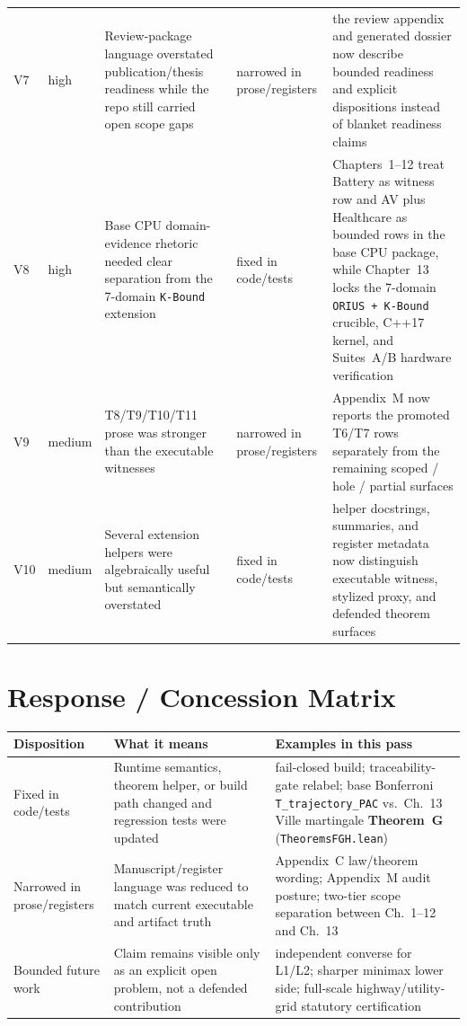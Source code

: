 \begin{longtable}{p{}p{}p{}p{}p{}}
V7 & high & Review-package language overstated publication/thesis readiness while the repo still carried open scope gaps & narrowed in prose/registers & the review appendix and generated dossier now describe bounded readiness and explicit dispositions instead of blanket readiness claims \\
V8 & high & Base CPU domain-evidence rhetoric needed clear separation from the 7-domain \texttt{K-Bound} extension & fixed in code/tests & Chapters~1--12 treat Battery as witness row and AV plus Healthcare as bounded rows in the base CPU package, while Chapter~13 locks the 7-domain \texttt{ORIUS + K-Bound} crucible, C++17 kernel, and Suites~A/B hardware verification \\
V9 & medium & T8/T9/T10/T11 prose was stronger than the executable witnesses & narrowed in prose/registers & Appendix~M now reports the promoted T6/T7 rows separately from the remaining scoped / hole / partial surfaces \\
V10 & medium & Several extension helpers were algebraically useful but semantically overstated & fixed in code/tests & helper docstrings, summaries, and register metadata now distinguish executable witness, stylized proxy, and defended theorem surfaces \\
\bottomrule
\end{longtable}

\section{Response / Concession Matrix}

\begin{tabular}{@{}p{}p{}p{}@{}}
\toprule
\textbf{Disposition} & \textbf{What it means} & \textbf{Examples in this pass} \\
\midrule
Fixed in code/tests & Runtime semantics, theorem helper, or build path changed and regression tests were updated & fail-closed build; traceability-gate relabel; base Bonferroni \texttt{T\_trajectory\_PAC} vs.\ Ch.~13 Ville martingale \textbf{Theorem~G} (\texttt{TheoremsFGH.lean}) \\
Narrowed in prose/registers & Manuscript/register language was reduced to match current executable and artifact truth & Appendix~C law/theorem wording; Appendix~M audit posture; two-tier scope separation between Ch.~1--12 and Ch.~13 \\
Bounded future work & Claim remains visible only as an explicit open problem, not a defended contribution & independent converse for L1/L2; sharper minimax lower side; full-scale highway/utility-grid statutory certification \\
\bottomrule
\end{tabular}

